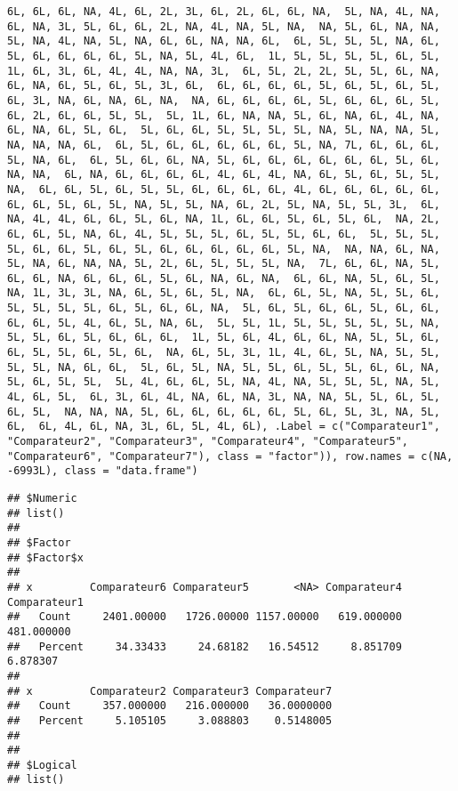 \documentclass[
]{article}
\begin{document}
\begin{verbatim}
6L, 6L, 6L, NA, 4L, 6L, 2L, 3L, 6L, 2L, 6L, 6L, NA,  5L, NA, 4L, NA, 6L, NA, 3L, 5L, 6L, 6L, 2L, NA, 4L, NA, 5L, NA,  NA, 5L, 6L, NA, NA, 5L, NA, 4L, NA, 5L, NA, 6L, 6L, NA, NA, 6L,  6L, 5L, 5L, 5L, NA, 6L, 5L, 6L, 6L, 6L, 6L, 5L, NA, 5L, 4L, 6L,  1L, 5L, 5L, 5L, 5L, 6L, 5L, 1L, 6L, 3L, 6L, 4L, 4L, NA, NA, 3L,  6L, 5L, 2L, 2L, 5L, 5L, 6L, NA, 6L, NA, 6L, 5L, 6L, 5L, 3L, 6L,  6L, 6L, 6L, 6L, 5L, 6L, 5L, 6L, 5L, 6L, 3L, NA, 6L, NA, 6L, NA,  NA, 6L, 6L, 6L, 6L, 5L, 6L, 6L, 6L, 5L, 6L, 2L, 6L, 6L, 5L, 5L,  5L, 1L, 6L, NA, NA, 5L, 6L, NA, 6L, 4L, NA, 6L, NA, 6L, 5L, 6L,  5L, 6L, 6L, 5L, 5L, 5L, 5L, NA, 5L, NA, NA, 5L, NA, NA, NA, 6L,  6L, 5L, 6L, 6L, 6L, 6L, 6L, 5L, NA, 7L, 6L, 6L, 6L, 5L, NA, 6L,  6L, 5L, 6L, 6L, NA, 5L, 6L, 6L, 6L, 6L, 6L, 6L, 5L, 6L, NA, NA,  6L, NA, 6L, 6L, 6L, 6L, 4L, 6L, 4L, NA, 6L, 5L, 6L, 5L, 5L, NA,  6L, 6L, 5L, 6L, 5L, 5L, 6L, 6L, 6L, 6L, 4L, 6L, 6L, 6L, 6L, 6L,  6L, 6L, 5L, 6L, 5L, NA, 5L, 5L, NA, 6L, 2L, 5L, NA, 5L, 5L, 3L,  6L, NA, 4L, 4L, 6L, 6L, 5L, 6L, NA, 1L, 6L, 6L, 5L, 6L, 5L, 6L,  NA, 2L, 6L, 6L, 5L, NA, 6L, 4L, 5L, 5L, 5L, 6L, 5L, 5L, 6L, 6L,  5L, 5L, 5L, 5L, 6L, 6L, 5L, 6L, 5L, 6L, 6L, 6L, 6L, 6L, 5L, NA,  NA, NA, 6L, NA, 5L, NA, 6L, NA, NA, 5L, 2L, 6L, 5L, 5L, 5L, NA,  7L, 6L, 6L, NA, 5L, 6L, 6L, NA, 6L, 6L, 6L, 5L, 6L, NA, 6L, NA,  6L, 6L, NA, 5L, 6L, 5L, NA, 1L, 3L, 3L, NA, 6L, 5L, 6L, 5L, NA,  6L, 6L, 5L, NA, 5L, 5L, 6L, 5L, 5L, 5L, 5L, 6L, 5L, 6L, 6L, NA,  5L, 6L, 5L, 6L, 6L, 5L, 6L, 6L, 6L, 6L, 5L, 4L, 6L, 5L, NA, 6L,  5L, 5L, 1L, 5L, 5L, 5L, 5L, 5L, NA, 5L, 5L, 6L, 5L, 6L, 6L, 6L,  1L, 5L, 6L, 4L, 6L, 6L, NA, 5L, 5L, 6L, 6L, 5L, 5L, 6L, 5L, 6L,  NA, 6L, 5L, 3L, 1L, 4L, 6L, 5L, NA, 5L, 5L, 5L, 5L, NA, 6L, 6L,  5L, 6L, 5L, NA, 5L, 5L, 6L, 5L, 5L, 6L, 6L, NA, 5L, 6L, 5L, 5L,  5L, 4L, 6L, 6L, 5L, NA, 4L, NA, 5L, 5L, 5L, NA, 5L, 4L, 6L, 5L,  6L, 3L, 6L, 4L, NA, 6L, NA, 3L, NA, NA, 5L, 5L, 6L, 5L, 6L, 5L,  NA, NA, NA, 5L, 6L, 6L, 6L, 6L, 6L, 5L, 6L, 5L, 3L, NA, 5L, 6L,  6L, 4L, 6L, NA, 3L, 6L, 5L, 4L, 6L), .Label = c("Comparateur1",  "Comparateur2", "Comparateur3", "Comparateur4", "Comparateur5",  "Comparateur6", "Comparateur7"), class = "factor")), row.names = c(NA,  -6993L), class = "data.frame")
\end{verbatim}

\begin{verbatim}
## $Numeric
## list()
## 
## $Factor
## $Factor$x
##          
## x         Comparateur6 Comparateur5       <NA> Comparateur4 Comparateur1
##   Count     2401.00000   1726.00000 1157.00000   619.000000   481.000000
##   Percent     34.33433     24.68182   16.54512     8.851709     6.878307
##          
## x         Comparateur2 Comparateur3 Comparateur7
##   Count     357.000000   216.000000   36.0000000
##   Percent     5.105105     3.088803    0.5148005
## 
## 
## $Logical
## list()
\end{verbatim}
\end{document}
